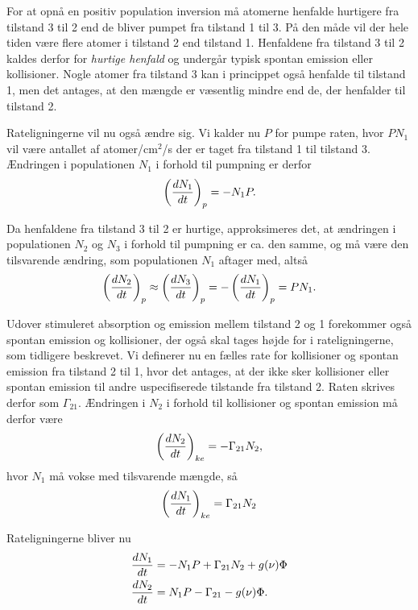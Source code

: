 For at opnå en positiv population inversion må atomerne henfalde hurtigere fra tilstand 3 til 2 end de bliver pumpet fra tilstand 1 til 3. På den måde vil der hele tiden være flere atomer i tilstand 2 end tilstand 1. Henfaldene fra tilstand 3 til 2 kaldes derfor for \emph{hurtige henfald} og undergår typisk spontan emission eller kollisioner. Nogle atomer fra tilstand 3 kan i princippet også henfalde til tilstand 1, men det antages, at den mængde er væsentlig mindre end de, der henfalder til tilstand 2. 

Rateligningerne vil nu også ændre sig. Vi kalder nu $P$ for pumpe raten, hvor $PN_1$ vil være antallet af atomer/cm$^2$/s der er taget fra tilstand 1 til tilstand 3. Ændringen i populationen $N_1$ i forhold til pumpning er derfor 
\begin{equation}
\left( {d{N_1} \over d{t}}\right)_{p} = -N_1P.
\end{equation}

Da henfaldene fra tilstand 3 til 2 er hurtige, approksimeres det, at ændringen i populationen $N_2$ og $N_3$ i forhold til pumpning er ca. den samme, og må være den tilsvarende ændring, som populationen $N_1$ aftager med, altså 
\begin{equation}
\left({d{N_2} \over d{t}}\right)_{p} \approx \left({d{N_3} \over d{t}}\right)_{p} = -\left({d{N_1} \over d{t}}\right)_{p} = PN_1.
\end{equation}

Udover stimuleret absorption og emission mellem tilstand 2 og 1 forekommer også spontan emission og kollisioner, der også skal tages højde for i rateligningerne, som tidligere beskrevet. Vi definerer nu en fælles rate for kollisioner og spontan emission fra tilstand 2 til 1, hvor det antages, at der ikke sker kollisioner eller spontan emission til andre uspecifiserede tilstande fra tilstand 2. Raten skrives derfor som $\Gamma_{21}$. Ændringen i $N_2$ i forhold til kollisioner og spontan emission må derfor være 
\begin{equation}
\left({d{N_2} \over d{t}}\right)_{ke} = - \Gamma_{21}N_2,
\end{equation}
hvor $N_1$ må vokse med tilsvarende mængde, så 
\begin{equation}
\left({d{N_1} \over d{t}}\right)_{ke} = \Gamma_{21}N_2
\end{equation}


Rateligningerne bliver nu 
\begin{align}
{d{N_1} \over d{t}} &= -N_1P + \Gamma_{21}N_2 + g(\nu)\Phi\\
{d{N_2} \over d{t}} &=N_1P - \Gamma_{21} - g(\nu)\Phi.
\end{align}

